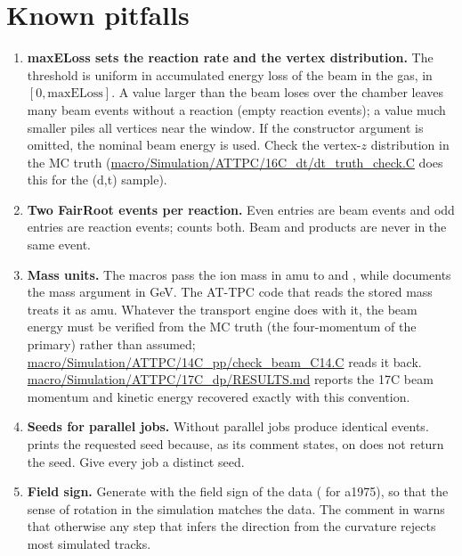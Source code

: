 \section{Known pitfalls}
\label{sec:sim:pitfalls}

\begin{enumerate}
  \item \textbf{maxELoss sets the reaction rate and the vertex distribution.} The threshold is
    uniform in accumulated energy loss of the beam in the gas, in $[0,\mathrm{maxELoss}]$. A value
    larger than the beam loses over the chamber leaves many beam events without a reaction (empty
    reaction events); a value much smaller piles all vertices near the window. If the constructor
    argument is omitted, the nominal beam energy is used. Check the vertex-$z$ distribution in the
    MC truth (\url{macro/Simulation/ATTPC/16C_dt/dt_truth_check.C} does this for the (d,t)
    sample).
  \item \textbf{Two FairRoot events per reaction.} Even entries are beam events and odd entries are
    reaction events;  counts both. Beam and products are never in the same event.
  \item \textbf{Mass units.} The macros pass the ion mass in amu to  and
    , while  documents the mass argument in GeV. The AT-TPC code
    that reads the stored mass treats it as amu. Whatever the transport engine does with it, the
    beam energy must be verified from the MC truth (the  four-momentum of the
    primary) rather than assumed; \url{macro/Simulation/ATTPC/14C_pp/check_beam_C14.C} reads it
    back. \url{macro/Simulation/ATTPC/17C_dp/RESULTS.md} reports the 17C beam momentum and kinetic
    energy recovered exactly with this convention.
  \item \textbf{Seeds for parallel jobs.} Without  parallel jobs
    produce identical events.  prints the requested seed because, as its
    comment states,  on  does not return the seed.
    Give every job a distinct seed.
  \item \textbf{Field sign.} Generate with the field sign of the data
    ( for a1975), so that the sense of rotation in the simulation matches
    the data. The comment in  warns that otherwise any step that infers the
    direction from the curvature rejects most simulated tracks.

\end{enumerate}
